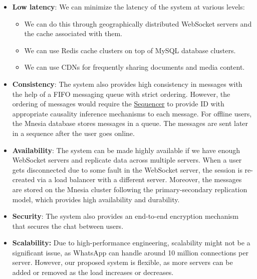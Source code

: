 \begin{itemize}
\item
\protect{}\label{L4rHGQk10MuGpA6uJs0hy}
\textbf{Low latency}: We can minimize the latency of the system at various levels:

\begin{itemize}
\item
We can do this through geographically distributed WebSocket servers and the cache associated with them.
\item
We can use Redis cache clusters on top of MySQL database clusters.
\item
We can use CDNs for frequently sharing documents and media content.
\end{itemize}
\item
\protect{}\label{kPq9eh3g7Pc1gLH6nZpPG}
\textbf{Consistency}: The system also provides high consistency in messages with the help of a FIFO messaging queue with strict ordering. However, the ordering of messages would require the \href{https://www.educative.io/courses/grokking-the-system-design-interview/system-design-sequencer}{Sequencer} to provide ID with appropriate causality inference mechanisms to each message. For offline users, the Mnesia database stores messages in a queue. The messages are sent later in a sequence after the user goes online.
\item
\protect{}\label{S785WxJL5Wya0ISEUq3G4}
\textbf{Availability}: The system can be made highly available if we have enough WebSocket servers and replicate data across multiple servers. When a user gets disconnected due to some fault in the WebSocket server, the session is re-created via a load balancer with a different server. Moreover, the messages are stored on the Mnesia cluster following the primary-secondary replication model, which provides high availability and durability.
\item
\protect{}\label{XGWOXs9WeS6yY_4YrB7Jz}
\textbf{Security}: The system also provides an end-to-end encryption mechanism that secures the chat between users.
\item
\protect{}\label{tCXV-vFl6FC-JGGspk0J3}
\textbf{Scalability:} Due to high-performance engineering, scalability might not be a significant issue, as WhatsApp can handle around 10 million connections per server. However, our proposed system is flexible, as more servers can be added or removed as the load increases or decreases.
\end{itemize}

